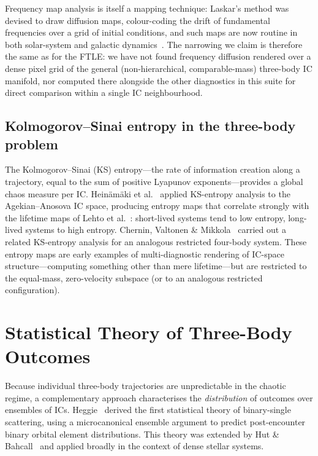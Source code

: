 \documentclass[11pt,a4paper]{article}
\begin{document}
Frequency map analysis is itself a mapping technique: Laskar's method was devised to draw
diffusion maps, colour-coding the drift of fundamental frequencies over a grid of initial
conditions, and such maps are now routine in both solar-system and galactic dynamics~\cite{laskar1993}.
The narrowing we claim is therefore the same as for the FTLE: we have not found frequency
diffusion rendered over a dense pixel grid of the general (non-hierarchical, comparable-mass)
three-body IC manifold, nor computed there alongside the other diagnostics in this suite for
direct comparison within a single IC neighbourhood.

\subsection{Kolmogorov--Sinai entropy in the three-body problem}
\label{sec:ksentropy}

The Kolmogorov--Sinai (KS) entropy---the rate of information creation along a trajectory,
equal to the sum of positive Lyapunov exponents---provides a global chaos measure per IC.
Heinäm\"{a}ki et al.~\cite{chernin2000} applied KS-entropy analysis to the
Agekian--Anosova IC space, producing entropy maps that correlate strongly with the lifetime
maps of Lehto et al.~\cite{lehto2008}: short-lived systems tend to low entropy, long-lived
systems to high entropy.  Chernin, Valtonen \& Mikkola~\cite{chernin1994} carried out a
related KS-entropy analysis for an analogous restricted four-body system.  These entropy maps
are early examples of multi-diagnostic rendering of IC-space structure---computing something
other than mere lifetime---but are restricted to the equal-mass, zero-velocity subspace (or
to an analogous restricted configuration).

\section{Statistical Theory of Three-Body Outcomes}

Because individual three-body trajectories are unpredictable in the chaotic regime, a
complementary approach characterises the \emph{distribution} of outcomes over ensembles of ICs.
Heggie~\cite{heggie1975} derived the first statistical theory of binary-single scattering, using
a microcanonical ensemble argument to predict post-encounter binary orbital element distributions.
This theory was extended by Hut \& Bahcall~\cite{hutbahcall1983} and applied broadly in the
context of dense stellar systems.
\end{document}
